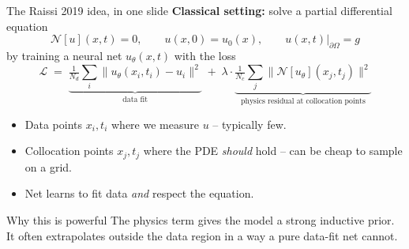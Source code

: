 \documentclass[aspectratio=169,10pt]{beamer}
\begin{document}
\begin{frame}{The Raissi 2019 idea, in one slide}
\textbf{Classical setting:} solve a partial differential equation
\begin{equation*}
\mathcal{N}[u](x, t) = 0, \qquad u(x, 0) = u_0(x), \qquad u(x, t)|_{\partial \Omega} = g
\end{equation*}
by training a neural net $u_\theta(x,t)$ with the loss
\begin{equation*}
\boxed{\;\mathcal{L} \;=\; \underbrace{\tfrac{1}{N_d}\sum_i \|u_\theta(x_i, t_i) - u_i\|^2}_{\text{data fit}} \;+\; \lambda \cdot \underbrace{\tfrac{1}{N_c}\sum_j \|\mathcal{N}[u_\theta](x_j, t_j)\|^2}_{\text{physics residual at collocation points}}\;}
\end{equation*}
\vspace{0.2em}
\begin{itemize}
  \item Data points $x_i, t_i$ where we measure $u$ -- typically few.
  \item Collocation points $x_j, t_j$ where the PDE \emph{should} hold -- can be cheap to sample on a grid.
  \item Net learns to fit data \emph{and} respect the equation.
\end{itemize}
\vspace{0.3em}
\begin{block}{Why this is powerful}
The physics term gives the model a strong inductive prior. It often extrapolates outside the data region in a way a pure data-fit net cannot.
\end{block}
\end{frame}
\end{document}
